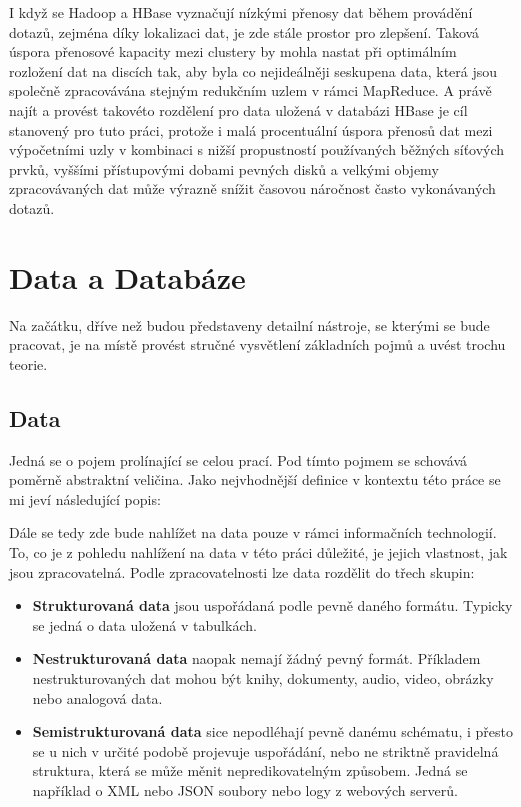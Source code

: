 \documentclass[thesis=M,czech]{FITthesis}[2012/06/26]
\begin{document}
\begin{introduction}
I když se Hadoop a HBase vyznačují nízkými přenosy dat během provádění dotazů, zejména díky lokalizaci dat, je zde stále prostor pro zlepšení. Taková úspora přenosové kapacity mezi clustery by mohla nastat při optimálním rozložení dat na discích tak, aby byla co nejideálněji seskupena data, která jsou společně zpracovávána stejným redukčním uzlem v rámci MapReduce. A právě najít a provést takovéto rozdělení pro data uložená v databázi HBase je cíl stanovený pro tuto práci, protože i malá procentuální úspora přenosů dat mezi výpočetními uzly v kombinaci s nižší propustností používaných běžných síťových prvků, vyššími přístupovými dobami pevných disků a velkými objemy zpracovávaných dat může výrazně snížit časovou náročnost často vykonávaných dotazů. 


\end{introduction}
\chapter{Data a Databáze}
Na začátku, dříve než budou představeny detailní nástroje, se kterými se bude pracovat, je na místě provést stručné vysvětlení základních pojmů a uvést trochu teorie. 
\section{Data}
Jedná se o pojem prolínající se celou prací. Pod tímto pojmem se schovává poměrně abstraktní veličina. Jako nejvhodnější definice v kontextu této práce se mi jeví následující popis:

\medskip
\textit{} \cite{data}
\medskip

Dále se tedy zde bude nahlížet na data pouze v rámci informačních technologií. To, co je z pohledu nahlížení na data v této práci důležité, je jejich vlastnost, jak jsou zpracovatelná. Podle zpracovatelnosti lze data rozdělit do třech skupin:
\begin{itemize}
\item \textbf{Strukturovaná data} jsou uspořádaná podle pevně daného formátu. Typicky se jedná o data uložená v tabulkách.

\item \textbf{Nestrukturovaná data} naopak nemají žádný pevný formát. Příkladem nestrukturovaných dat mohou být knihy, dokumenty, audio, video, obrázky nebo analogová data.

\item \textbf{Semistrukturovaná data} sice nepodléhají pevně danému schématu, i přesto se u nich v určité podobě projevuje uspořádání, nebo ne striktně pravidelná struktura, která se může měnit nepredikovatelným způsobem. Jedná se například o XML nebo JSON soubory nebo logy z webových serverů.
\end{itemize}
 
\end{document}

